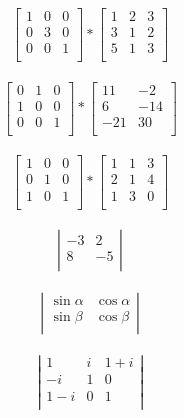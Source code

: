 \documentclass[20pt, letterpaper, titlepage]{article}
\begin{document}
\begin{LARGE}
$$
\begin{bmatrix}
1 & 0 & 0\\
0 & 3 & 0\\
0 & 0 & 1\\
\end{bmatrix}
*
\begin{bmatrix}
1 & 2 & 3\\
3 & 1 & 2\\
5 & 1 & 3\\
\end{bmatrix}
$$\\

$$
\left[ \begin{array}{rrr}
0 & 1 & 0\\
1 & 0 & 0\\
0 & 0 & 1\\
\end{array} \right]
*
\left[ \begin{array}{rr}
11 & -2\\
6 & -14\\
-21 & 30\\
\end{array} \right]
$$\\

$$
\left[ \begin{array}{rrr}
1 & 0 & 0\\
0 & 1 & 0\\
1 & 0 & 1\\
\end{array} \right]
*
\left[ \begin{array}{rrr}
1 & 1 & 3\\
2 & 1 & 4\\
1 & 3 & 0\\
\end{array} \right]
$$\\

$$
\left| \begin{array}{rr}
-3 & 2\\
8 & -5\\
\end{array} \right|
$$\\

$$
\left| \begin{array}{rr}
\sin \alpha & \cos  \alpha\\
\sin \beta & \cos \beta\\
\end{array} \right|
$$\\

$$
\left| \begin{array}{ccc}
1 & i & 1 + i\\
-i & 1 & 0\\
1 - i & 0 & 1\\
\end{array} \right|
$$\\


\end{LARGE}
\end{document}
